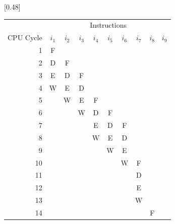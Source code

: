 \begin{table}
{{        }
    }
    \hfill
    \parbox[b][0.8\textheight][s]{0.48\textwidth}{%
        \scriptsize
        \centering
        [0.48\textwidth]{%
            \begin{tabular}{rccccccccc} \toprule
                & \multicolumn{9}{c}{\fontsize{11pt}{9pt}\selectfont Instructions} \\
                \cmidrule{2-10}
                {\fontsize{11pt}{9pt}\selectfont CPU Cycle} & 
                {\fontsize{11pt}{9pt}\selectfont $i_1$} & 
                {\fontsize{11pt}{9pt}\selectfont $i_2$} & 
                {\fontsize{11pt}{9pt}\selectfont $i_3$} & 
                {\fontsize{11pt}{9pt}\selectfont $i_4$} & 
                {\fontsize{11pt}{9pt}\selectfont $i_5$} & 
                {\fontsize{11pt}{9pt}\selectfont $i_6$} & 
                {\fontsize{11pt}{9pt}\selectfont $i_7$} & 
                {\fontsize{11pt}{9pt}\selectfont $i_8$} & 
                {\fontsize{11pt}{9pt}\selectfont $i_9$} \\
                \midrule
                 1 & F &   &   &   &   &   &   &   &   \\ \rowcolor[gray]{.975}
                 2 & D & F &   &   &   &   &   &   &   \\
                 3 & E & D & F &   &   &   &   &   &   \\ \rowcolor[gray]{.975}
                 4 & W & E & D &   &   &   &   &   &   \\
                 5 &   & W & E & F &   &   &   &   &   \\ \rowcolor[gray]{.975}
                 6 &   &   & W & D & F &   &   &   &   \\
                 7 &   &   &   & E & D & F &   &   &   \\ \rowcolor[gray]{.975}
                 8 &   &   &   & W & E & D &   &   &   \\
                 9 &   &   &   &   & W & E &   &   &   \\ \rowcolor[gray]{.975}
                10 &   &   &   &   &   & W & F &   &   \\
                11 &   &   &   &   &   &   & D &   &   \\ \rowcolor[gray]{.975}
                12 &   &   &   &   &   &   & E &   &   \\
                13 &   &   &   &   &   &   & W &   &   \\ \rowcolor[gray]{.975}
                14 &   &   &   &   &   &   &   & F &   \\

\end{tabular}}}
\end{table}
